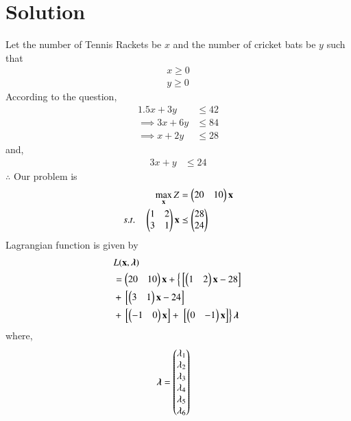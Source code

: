 \documentclass[journal,12pt,twocolumn]{IEEEtran}
\begin{document}
\section{Solution}
\begin{table}[!ht]
\centering
{}
\caption{factory Requirements}
\label{tab:table1}
\end{table}
Let the number of Tennis Rackets  be $x$ and the number of cricket bats be $y$  such that 
\begin{align}
x \geq 0 \\
y \geq 0 
\end{align}
According to the question,
\begin{align}
1.5x+3y &\leq 42 \\
\implies 3x+6y &\leq 84 \\
\implies x+2y &\leq 28 
\end{align}
and,
\begin{align}
3x+y &\leq 24 
\end{align}
$\therefore$ Our problem is
\begin{align}
\max_{\mathbf{x}} Z &= \begin{pmatrix}20 & 10\end{pmatrix}\mathbf{x}\\
s.t. \quad \begin{pmatrix}1 & 2 \\ 3 & 1\end{pmatrix}\mathbf{x} &\preceq \begin{pmatrix}28\\24\end{pmatrix} 
\end{align}
Lagrangian function is given by
\begin{equation}
\begin{aligned}
&L(\mathbf{x},\boldsymbol{\lambda}) \\ &= \begin{pmatrix}20 & 10\end{pmatrix}\mathbf{x}+\left\{{}\left[\begin{pmatrix}1 & 2\end{pmatrix}\mathbf{x}-28\right]\right. \\ &+ {}\left[\begin{pmatrix}3 & 1\end{pmatrix}\mathbf{x}-24\right]\\ &+ {}\left[\begin{pmatrix}-1 & 0\end{pmatrix}\mathbf{x}\right] +\left.{}\left[\begin{pmatrix}0 & -1\end{pmatrix}\mathbf{x}\right]\right\}\boldsymbol{\lambda}
\end{aligned}
\end{equation}
where,
\begin{align}
\boldsymbol{\lambda} &= \begin{pmatrix}\lambda_1 \\ \lambda_2 \\ \lambda_3 \\ \lambda_4 \\ \lambda_5 \\ \lambda_6\end{pmatrix}
\end{align}
\end{document}
